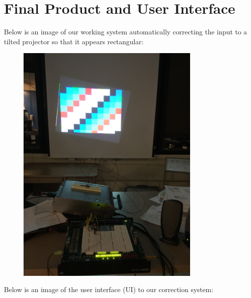 \documentclass{article}
\begin{document}
\section{Final Product and User Interface}
Below is an image of our working system automatically correcting the input to a tilted projector so that it appears rectangular:
\begin{center}
\begin{figure}[H]
\includegraphics[width=0.8\textwidth]{./img/full-system}
\end{figure}
\end{center}
Below is an image of the user interface (UI) to our correction system:
\end{document}
